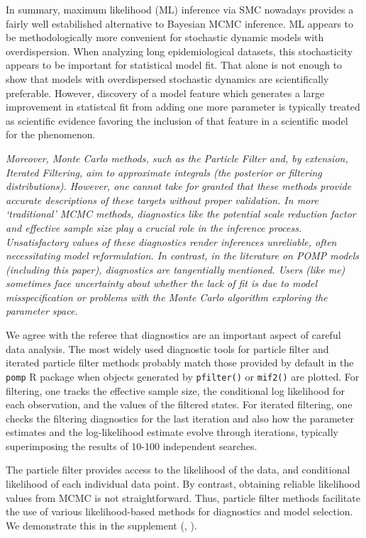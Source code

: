\documentclass[11pt]{article}
\newcommand\code[1]{\texttt{#1}}
\newcommand\report[1]{{\color{mygreen} \vspace{1mm}\hspace{0.25in}\parbox{6in}{\em #1}}}
\begin{document}
In summary, maximum likelihood (ML) inference via SMC nowadays provides a fairly well estabilished alternative to Bayesian MCMC inference. ML appears to be methodologically more convenient for stochastic dynamic models with overdispersion. When analyzing long epidemiological datasets, this stochasticity appears to be important for statistical model fit. That alone is not enough to show that models with overdispersed stochastic dynamics are scientifically preferable. However, discovery of a  model feature which generates a large improvement in statistcal fit from adding one more parameter is typically treated as scientific evidence favoring the inclusion of that feature in a scientific model for the phenomenon.

\report{
Moreover, Monte Carlo methods, such as the Particle Filter and, by extension, Iterated Filtering, aim to approximate integrals (the posterior or filtering distributions). However, one cannot take for granted that these methods provide accurate descriptions of these targets without proper validation. In more ‘traditional’ MCMC methods, diagnostics like the potential scale reduction factor and effective sample size play a crucial role in the inference process. Unsatisfactory values of these diagnostics render inferences unreliable, often necessitating model reformulation. In contrast, in the literature on POMP models (including this paper), diagnostics are tangentially mentioned. Users (like me) sometimes face uncertainty about whether the lack of fit is due to model misspecification or problems with the Monte Carlo algorithm exploring the parameter space.
}

We agree with the referee that diagnostics are an important aspect of careful data analysis.
The most widely used diagnostic tools for particle filter and iterated particle filter methods probably match those provided by default in the \code{pomp} R package \cite{king16} when objects generated by \code{pfilter()} or \code{mif2()} are plotted.
For filtering, one tracks the effective sample size, the conditional log likelihood for each observation, and the values of the filtered states.
For iterated filtering, one checks the filtering diagnostics for the last iteration and also how the parameter estimates and the log-likelihood estimate evolve through iterations, typically superimposing the results of 10-100 independent searches.

The particle filter provides access to the likelihood of the data, and conditional likelihood of each individual data point.
By contrast, obtaining reliable likelihood values from MCMC is not straightforward.
Thus, particle filter methods facilitate the use of various likelihood-based methods for diagnostics and model selection.
We demonstrate this in the supplement (, ). 
\end{document}
